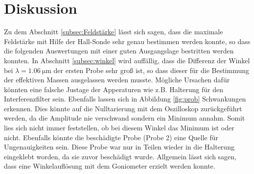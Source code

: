 \section{Diskussion}
\label{sec:Diskussion}
Zu dem Abschnitt \ref{subsec:Feldstärke} lässt sich sagen, dass die maximale Feldstärke mit Hilfe der Hall-Sonde sehr genau bestimmen werden konnte, so dass 
die folgenden Auswertungen mit einer guten Ausgangslage bestritten werden konnten.
In Abschnitt \ref{subsec:winkel} wird auffällig, dass die Differenz der Winkel bei $\lambda = \qty{1.06}{\micro\metre}$ der ersten Probe
sehr groß ist, so dass dieser für die Bestimmung der effektiven Massen ausgelassen werden musste. 
Mögliche Ursachen dafür könnten eine falsche Justage der Apperaturen wie z.B. Halterung für den Interferenzfilter sein.
Ebenfalls lassen sich in Abbildung \ref{fig:prob} Schwankungen erkennen.
Dies könnte auf die Nulltarierung mit dem Oszilloskop zurückgeführt werden, da die Amplitude nie verschwand sondern ein Minimum annahm. 
Somit lies sich nicht immer feststellen, ob bei diesem Winkel das Minimum ist oder nicht.
Ebenfalls könnte die beschädigte Probe (Probe 2) eine Quelle für Ungenauigkeiten sein. 
Diese Probe war nur in Teilen wieder in die Halterung eingeklebt worden, da sie zuvor beschädigt wurde.
Allgemein lässt sich sagen, dass eine Winkelauflösung mit dem Goniometer erzielt werden konnte.